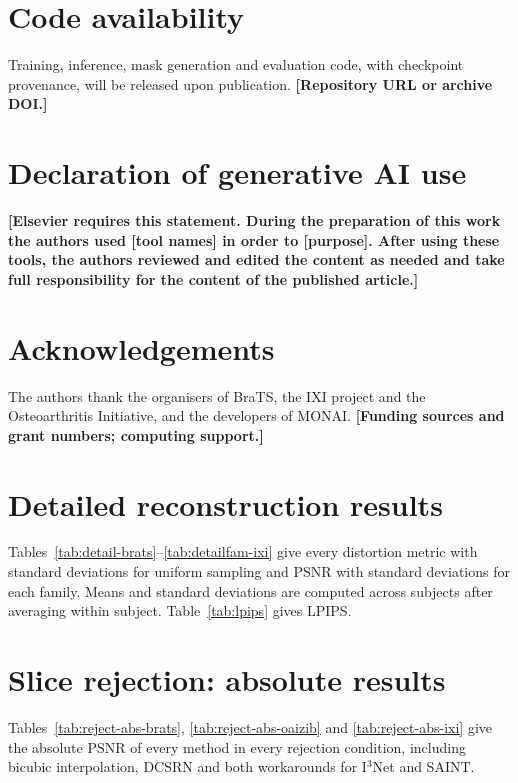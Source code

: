 \documentclass[a4paper,fleqn]{cas-dc}
\newcommand{\authorfill}[1]{\textcolor{pendfg}{\textbf{[#1]}}}
\newcommand{\Ithree}{I$^3$Net\xspace}
\begin{document}
\section*{Code availability}
Training, inference, mask generation and evaluation code, with checkpoint provenance, will be
released upon publication. \authorfill{Repository URL or archive DOI.}

\section*{Declaration of generative AI use}
\authorfill{Elsevier requires this statement. During the preparation of this work the
authors used [tool names] in order to [purpose]. After using these tools, the authors reviewed
and edited the content as needed and take full responsibility for the content of the
published article.}

\section*{Acknowledgements}
The authors thank the organisers of BraTS, the IXI project and the Osteoarthritis Initiative,
and the developers of MONAI. \authorfill{Funding sources and grant numbers; computing support.}




\clearpage
\onecolumn
\appendix

\section{Detailed reconstruction results}
\label{app:detail}

Tables~\ref{tab:detail-brats}--\ref{tab:detailfam-ixi} give every distortion metric with
standard deviations for uniform sampling and PSNR with standard deviations for each family.
Means and standard deviations are computed across subjects after averaging within subject.
Table~\ref{tab:lpips} gives LPIPS.




\FloatBarrier
\section{Slice rejection: absolute results}
\label{app:reject}

Tables~\ref{tab:reject-abs-brats}, \ref{tab:reject-abs-oaizib} and \ref{tab:reject-abs-ixi} give the absolute PSNR of every
method in every rejection condition, including bicubic interpolation, DCSRN and both
workarounds for \Ithree and SAINT.
\end{document}
